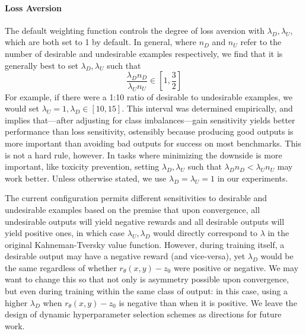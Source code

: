 \paragraph{Loss Aversion} The default weighting function controls the degree of loss aversion with $\lambda_D, \lambda_U$, which are both set to 1 by default.
In general, where $n_D$ and $n_U$ refer to the number of desirable and undesirable examples respectively, we find that it is generally best to set $\lambda_D, \lambda_U$ such that 
\begin{equation}
    \frac{\lambda_D n_D}{\lambda_U n_U} \in \left[ 1, \frac{3}{2} \right]
    \label{eq:weights}
\end{equation}
For example, if there were a 1:10 ratio of desirable to undesirable examples, we would set $\lambda_U = 1, \lambda_D \in [10, 15]$.
This interval was determined empirically, and implies that---after adjusting for class imbalances---gain sensitivity yields better performance than loss sensitivity, ostensibly because producing good outputs is more important than avoiding bad outputs for success on most benchmarks.
This is not a hard rule, however.
In tasks where minimizing the downside is more important, like toxicity prevention, setting $\lambda_D, \lambda_U$ such that
$\lambda_D n_D < \lambda_U n_U$ may work better.
Unless otherwise stated, we use $\lambda_D = \lambda_U = 1$ in our experiments.

The current configuration permits different sensitivities to desirable and undesirable examples based on the premise that upon convergence, all undesirable outputs will yield negative rewards and all desirable outputs will yield positive ones, in which case $\lambda_U, \lambda_D$ would directly correspond to $\lambda$ in the original Kahneman-Tversky value function.
However, during training itself, a desirable output may have a negative reward (and vice-versa), yet $\lambda_D$ would be the same regardless of whether $r_\theta(x,y) - z_0$ were positive or negative.
We may want to change this so that not only is asymmetry possible upon convergence, but even during training within the same class of output: in this case, using a higher $\lambda_D$ when $r_\theta(x,y) - z_0$ is negative than when it is positive.
We leave the design of dynamic hyperparameter selection schemes as directions for future work.

